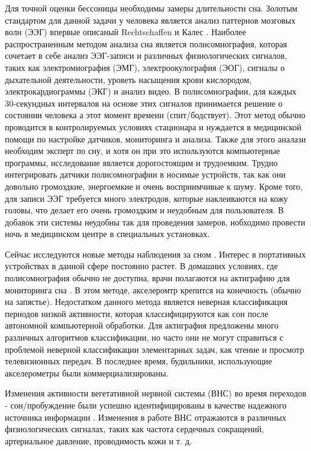 Для точной оценки бессоницы необходимы замеры длительности сна. Золотым стандартом для данной задачи у человека является анализ паттернов мозговых волн (ЭЭГ) впервые описаный Rechtschaffen и Калес \cite{eeg_for_sleep}. Наиболее распространенным методом анализа сна является полисомнография, которая сочетает в себе анализ ЭЭГ-записи и различных физиологических сигналов, таких как электромиография (ЭМГ), электроокулография (ЭОГ), сигналы о дыхательной деятельности, уроветь насыщения крови кислородом, электрокардиограммы (ЭКГ) и анализ видео. В полисомнографии, для каждых 30-секундных интервалов на основе этих сигналов принимается решение о состоянии человека а этот момент времени (спит/бодствует). Этот метод обычно проводится в контролируемых условиях стационара и нуждается в медицинской помощи по настройке датчиков, мониторинга и анализа. Также для этого аналази необходим эксперт по сну, и хотя он при это используются компьютерные программы, исследование является дорогостоящим и трудоемким. Трудно интегрировать датчики полисомнографии в носимые устройств, так как они довольно громоздкие, энергоемкие и очень восприимчивые к шуму. Кроме того, для записи ЭЭГ требуется много электродов, которые наклеиваются на кожу головы, что делает его очень громоздким и неудобным для пользователя. 
В добавок эти системы неудобны так для проведения замеров, нобходимо провести ночь в медицинском центре в специальных установках.

Сейчас исследуются новые методы наблюдения за сном \cite{monitor_sleep, monitor_sleep2, monitor_sleep3}. Интерес в портативных устройствах в данной сфере постоянно растет. В домашних условиях, где полисомнография обычно не доступна, врачи полагаются на актиграфию для мониторинга сна \cite{actigrafia}. В этом методе, акселеромтр крепится на конечность (обычно на запястье). Недостатком данного метода является неверная классификация периодов низкой активности, которая классифицируются как сон после автономной компьютерной обработки. Для актиграфия предложены много различных алгоритмов классификации, но часто они не могут справиться с проблемой неверной классификации элементарных задач, как чтение и просмотр телевизионных передач. В последнее время, будильники, использующие акселерометры были коммерциализированы.

Изменения активности вегетативной нервной системы (ВНС) во время переходов - сон/пробуждение были успешно идентифицированы в качестве надежного источника информации \cite{tosleep}. Изменения в работе ВНС отражаются в различных физиологических сигналах, таких как частота сердечных сокращений, артериальное давление, проводимость кожи и т. д. 

